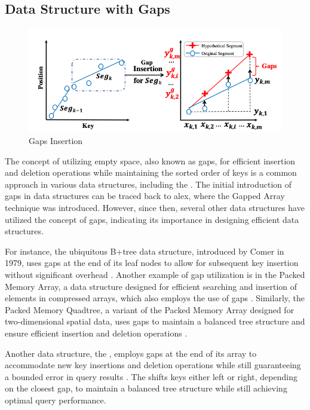 \subsection{Data Structure with Gaps}
\begin{figure}
    \centering
    \includegraphics[width=120mm,scale=1]{Figures/gapsinsert.png}
    \caption{
        Gaps Insertion \cite{GapsInsertion}
    }
    \label{fig:gapsinsert}
\end{figure}

The concept of utilizing empty space, also known as gaps, for efficient insertion and deletion operations while maintaining the sorted order of keys is a common approach in various data structures, including the \learnindex\cite{ALEX,LIPP,PGM,fittingtree,FloodLMD,Tsunami, GapsInsertion}. The initial introduction of gaps in data structures can be traced back to \acrshort{alex}, where the \textsf{Gapped Array} technique was introduced. However, since then, several other data structures have utilized the concept of gaps, indicating its importance in designing efficient data structures.

For instance, the ubiquitous B+tree data structure, introduced by Comer in 1979, uses gaps at the end of its leaf nodes to allow for subsequent key insertion without significant overhead \cite{comer1979ubiquitous}. Another example of gap utilization is in the Packed Memory Array, a data structure designed for efficient searching and insertion of elements in compressed arrays, which also employs the use of gaps \cite{PackedMemoryArray}. Similarly, the Packed Memory Quadtree, a variant of the Packed Memory Array designed for two-dimensional spatial data, uses gaps to maintain a balanced tree structure and ensure efficient insertion and deletion operations \cite{packedquadtree}.

Another data structure, the \fittingtree, employs gaps at the end of its array to accommodate new key insertions and deletion operations while still guaranteeing a bounded error in query results \cite{fittingtree}. The \fittingtree shifts keys either left or right, depending on the closest gap, to maintain a balanced tree structure while still achieving optimal query performance.

